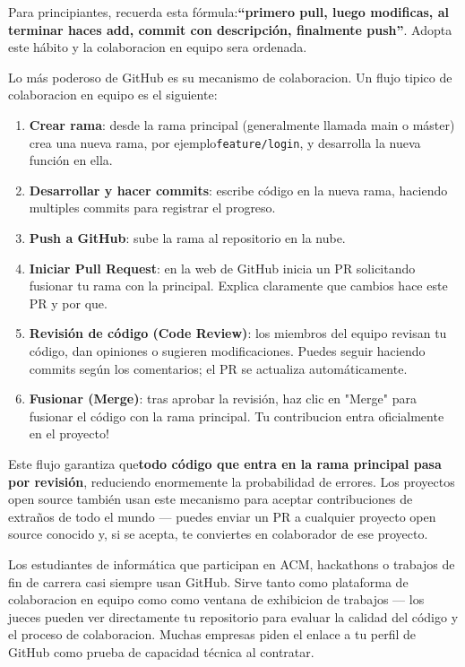 Para principiantes, recuerda esta fórmula:\textbf{“primero pull, luego modificas, al terminar haces add, commit con descripción, finalmente push”}. Adopta este hábito y la colaboracion en equipo sera ordenada.


Lo más poderoso de GitHub es su mecanismo de colaboracion. Un flujo tipico de colaboracion en equipo es el siguiente:

\begin{enumerate}
  \item \textbf{Crear rama}: desde la rama principal (generalmente llamada main o máster) crea una nueva rama, por ejemplo\texttt{feature/\allowbreak login}, y desarrolla la nueva función en ella.
  \item \textbf{Desarrollar y hacer commits}: escribe código en la nueva rama, haciendo multiples commits para registrar el progreso.
  \item \textbf{Push a GitHub}: sube la rama al repositorio en la nube.
  \item \textbf{Iniciar Pull Request}: en la web de GitHub inicia un PR solicitando fusionar tu rama con la principal. Explica claramente que cambios hace este PR y por que.
  \item \textbf{Revisión de código (Code Review)}: los miembros del equipo revisan tu código, dan opiniones o sugieren modificaciones. Puedes seguir haciendo commits según los comentarios; el PR se actualiza automáticamente.
  \item \textbf{Fusionar (Merge)}: tras aprobar la revisión, haz clic en "Merge" para fusionar el código con la rama principal. Tu contribucion entra oficialmente en el proyecto!
\end{enumerate}

Este flujo garantiza que\textbf{todo código que entra en la rama principal pasa por revisión}, reduciendo enormemente la probabilidad de errores. Los proyectos open source también usan este mecanismo para aceptar contribuciones de extraños de todo el mundo — puedes enviar un PR a cualquier proyecto open source conocido y, si se acepta, te conviertes en colaborador de ese proyecto.



Los estudiantes de informática que participan en ACM, hackathons o trabajos de fin de carrera casi siempre usan GitHub. Sirve tanto como plataforma de colaboracion en equipo como como ventana de exhibicion de trabajos — los jueces pueden ver directamente tu repositorio para evaluar la calidad del código y el proceso de colaboracion. Muchas empresas piden el enlace a tu perfil de GitHub como prueba de capacidad técnica al contratar.

